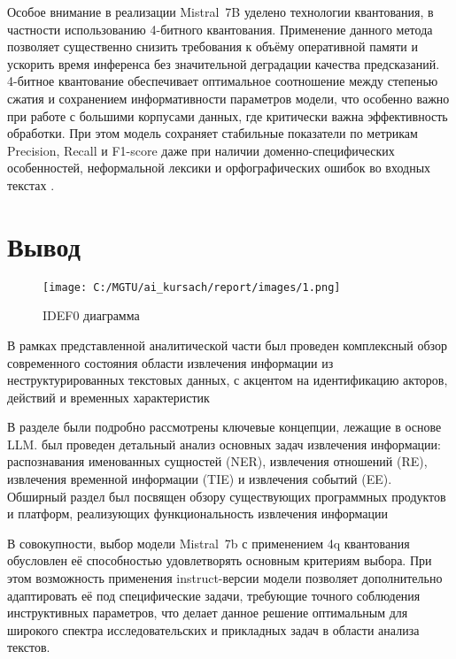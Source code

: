Особое внимание в реализации Mistral 7B уделено технологии квантования, в частности использованию 4-битного квантования. 
Применение данного метода позволяет существенно снизить требования к объёму оперативной памяти и ускорить время инференса без значительной деградации качества предсказаний. 
4-битное квантование обеспечивает оптимальное соотношение между степенью сжатия и
сохранением информативности параметров модели, что особенно важно при работе с большими корпусами данных, где критически важна эффективность обработки. 
При этом модель сохраняет стабильные показатели по метрикам Precision, Recall и F1-score даже при наличии доменно-специфических особенностей, 
неформальной лексики и орфографических ошибок во входных текстах \cite{lib:mistral_compare}.


\section*{Вывод}

\begin{figure}[H]
    \centering
    \texttt{[image: C:/MGTU/ai\_kursach/report/images/1.png]}
    \caption{IDEF0 диаграмма}
\end{figure}

В рамках представленной аналитической части был проведен комплексный обзор современного состояния области извлечения информации из неструктурированных текстовых данных, с акцентом на идентификацию акторов, действий и временных характеристик

В разделе были подробно рассмотрены ключевые концепции, лежащие в основе LLM.  был проведен детальный анализ основных задач извлечения информации: распознавания именованных сущностей (NER), извлечения отношений (RE), извлечения временной информации (TIE) и извлечения событий (EE).
Обширный раздел был посвящен обзору существующих программных продуктов и платформ, реализующих функциональность извлечения информации

В совокупности, выбор модели Mistral 7b с применением 4q квантования обусловлен её способностью удовлетворять основным критериям выбора. При этом возможность применения instruct-версии модели позволяет дополнительно адаптировать её под специфические задачи, требующие точного соблюдения инструктивных параметров, что делает данное решение оптимальным для широкого спектра исследовательских и прикладных задач в области анализа текстов.

\clearpage

